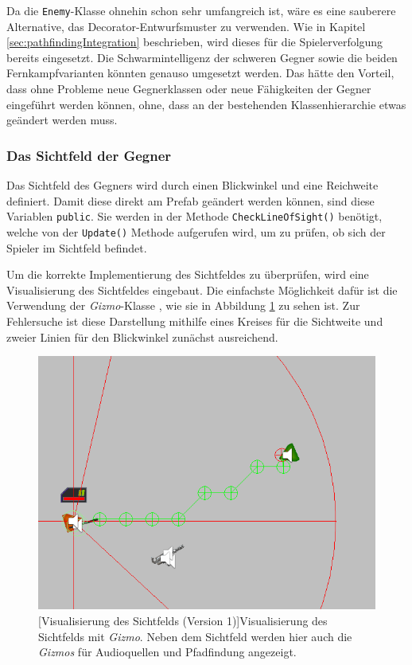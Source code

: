 Da die \texttt{Enemy}-Klasse ohnehin schon sehr umfangreich ist, wäre es eine sauberere Alternative, das Decorator-Entwurfsmuster zu verwenden. Wie in Kapitel \ref{sec:pathfindingIntegration} beschrieben, wird dieses für die Spielerverfolgung bereits eingesetzt. Die Schwarmintelligenz der schweren Gegner sowie die beiden Fernkampfvarianten könnten genauso umgesetzt werden. Das hätte den Vorteil, dass ohne Probleme neue Gegnerklassen oder neue Fähigkeiten der Gegner eingeführt werden können, ohne, dass an der bestehenden Klassenhierarchie etwas geändert werden muss.

\subsubsection{Das Sichtfeld der Gegner}
\label{sec:enemyImplementationFOV}

Das Sichtfeld des Gegners wird durch einen Blickwinkel und eine Reichweite definiert. Damit diese direkt am Prefab geändert werden können, sind diese Variablen \texttt{public}. Sie werden in der Methode \texttt{CheckLineOfSight()} benötigt, welche von der \texttt{Update()} Methode aufgerufen wird, um zu prüfen, ob sich der Spieler im Sichtfeld befindet.

Um die korrekte Implementierung des Sichtfeldes zu überprüfen, wird eine Visualisierung des Sichtfeldes eingebaut. Die einfachste Möglichkeit dafür ist die Verwendung der \textit{Gizmo}-Klasse \cite{Unity_Doc_Gizmo}, wie sie in Abbildung \ref{fig:fov1} zu sehen ist. Zur Fehlersuche ist diese Darstellung mithilfe eines Kreises für die Sichtweite und zweier Linien für den Blickwinkel zunächst ausreichend.

\begin{figure}[h]
 \centering
 \includegraphics[width=0.835\linewidth]{pics/field-of-view_gizmo.png}
 [Visualisierung des Sichtfelds (Version 1)]{Visualisierung des Sichtfelds mit \textit{Gizmo}. Neben dem Sichtfeld werden hier auch die \textit{Gizmos} für Audioquellen und Pfadfindung angezeigt.}
	\label{fig:fov1}
\end{figure}

